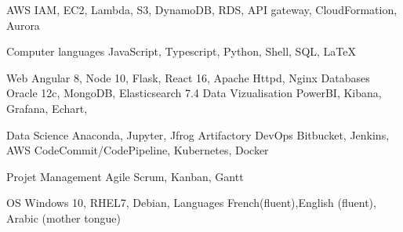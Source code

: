 

\begin{cvskills}

\cvskill
    {AWS} %
    {IAM, EC2, Lambda, S3, DynamoDB, RDS, API gateway, CloudFormation, Aurora } %

  \cvskill
    {Computer languages} %
    {JavaScript, Typescript, Python, Shell, SQL, LaTeX} %

  \cvskill
    {Web} %
    {Angular 8, Node 10, Flask, React 16, Apache Httpd, Nginx } %
  \cvskill
    {Databases} %
    {Oracle 12c, MongoDB, Elasticsearch 7.4 } %
\cvskill
    {Data Vizualisation} %
    {PowerBI, Kibana, Grafana, Echart,  } %
    
\cvskill
    {Data Science} %
    {Anaconda, Jupyter, Jfrog Artifactory  } %
  \cvskill
    {DevOps} %
    {Bitbucket, Jenkins, AWS CodeCommit/CodePipeline, Kubernetes, Docker } %

\cvskill
    {Projet Management} %
    {Agile Scrum, Kanban, Gantt } %

  \cvskill
    {OS} %
    {Windows 10, RHEL7, Debian,} %
  \cvskill
    {Languages } %
    {French(fluent),English (fluent), Arabic (mother tongue)} %
\end{cvskills}
